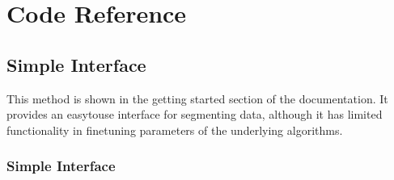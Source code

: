 \documentclass[letterpaper,10pt,english]{sphinxmanual}
\begin{document}
\section{Code Reference}
\label{\detokenize{code:code-reference}}\label{\detokenize{code::doc}}

\subsection{Simple Interface}
\label{\detokenize{code:simple-interface}}
\sphinxAtStartPar
This method is shown in the getting started section of the documentation. It provides an
easy\sphinxhyphen{}to\sphinxhyphen{}use interface for segmenting data, although it has limited functionality in
fine\sphinxhyphen{}tuning parameters of the underlying algorithms.


\subsubsection{Simple Interface}
\label{\detokenize{code_simple:simple-interface}}\label{\detokenize{code_simple::doc}}
\end{document}
